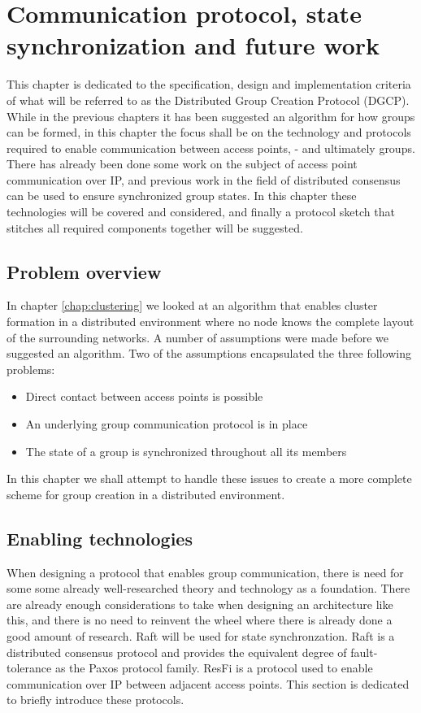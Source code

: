 \chapter{Communication protocol, state synchronization and future work}
\label{chap:proto}
This chapter is dedicated to the specification, design and implementation criteria of what will be referred to as the Distributed Group Creation Protocol (DGCP).
While in the previous chapters it has been suggested an algorithm for how groups can be formed, in this chapter the focus shall be on the technology and protocols required
to enable communication between access points, - and ultimately groups. There has already been done some work on the subject of access point communication over IP,
and previous work in the field of distributed consensus can be used to ensure synchronized group states. In this chapter these technologies will be covered and considered,
and finally a protocol sketch that stitches all required components together will be suggested. 


\section{Problem overview}
In chapter \ref{chap:clustering} we looked at an algorithm that enables cluster formation in a distributed environment where no node knows the complete layout of the surrounding networks.
A number of assumptions were made before we suggested an algorithm. Two of the assumptions encapsulated the three following problems:
\begin{itemize}
\item Direct contact between access points is possible
\item An underlying group communication protocol is in place
\item The state of a group is synchronized throughout all its members
\end{itemize}
In this chapter we shall attempt to handle these issues to create a more complete scheme for group creation in a distributed environment.

\section{Enabling technologies}
When designing a protocol that enables group communication, there is need for some some already well-researched theory and technology as a foundation. There are already enough
considerations to take when designing an architecture like this, and there is no need to reinvent the wheel where there is already done a good amount of research. 
Raft will be used for state synchronzation. Raft is a distributed consensus protocol and provides the equivalent degree of fault-tolerance as the Paxos \cite{lamport2001paxos} protocol family.
ResFi is a protocol used to enable communication over IP between adjacent access points. This section is dedicated to briefly introduce these protocols. 

